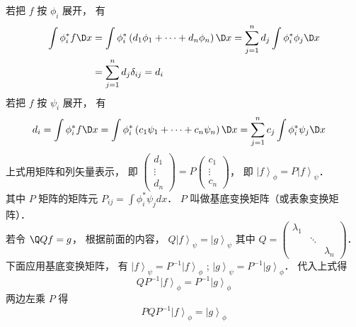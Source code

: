 若把 $f$ 按 ${\phi _i}$ 展开， 有
\begin{equation}
\begin{aligned}
\int {\phi _i^*f   \D x} & = \int {\phi _i^*\left( {{d_1}{\phi _1} + \dots + {d_n}{\phi _n}} \right)   \D x}  = \sum\limits_{j = 1}^n {{d_j}} \int {\phi _i^*{\phi _j} \D x}  \\
&= \sum\limits_{j = 1}^n {{d_j}} {\delta _{ij}} = {d_i}
\end{aligned}
\end{equation}
若把 $f$ 按 $\psi _i$ 展开， 有
\begin{equation}
\begin{aligned}
{d_i} & = \int {\phi _i^*f   \D x}   = \int {\phi _i^*\left( {{c_1}{\psi _1} + \dots + {c_n}{\psi _n}} \right)   \D x} = \sum\limits_{j = 1}^n {{c_j}} \int {\phi _i^*{\psi _j} \D x}
\end{aligned}
\end{equation}
上式用矩阵和列矢量表示， 即 $\left( {\begin{aligned}
{{d_1}}\\
 \vdots \\
{{d_n}}
\end{aligned}} \right) = P\left( {\begin{aligned}
{{c_1}}\\
 \vdots \\
{{c_n}}
\end{aligned}} \right)$，  即 ${\left| f \right\rangle _\phi } = P{\left| f \right\rangle _\psi }$．\\
其中 $P$ 矩阵的矩阵元 ${P_{ij}} = \int {\phi _i^*{\psi _j}dx} $．  $P$ 叫做基底变换矩阵（或表象变换矩阵）．\\
若令 $\Q Q f = g$，  根据前面的内容， $Q{\left| f \right\rangle _\psi } = {\left| g \right\rangle _\psi }$ 其中 $Q = \left( {\begin{aligned}
{{\lambda _1}}&{}&{}\\
{}& \ddots &{}\\
{}&{}&{{\lambda _n}}
\end{aligned}} \right)$． \\
下面应用基底变换矩阵， 有 ${\left| f \right\rangle _\psi } = {P^{ - 1}}{\left| f \right\rangle _\phi }$ ; ${\left| g \right\rangle _\psi } = {P^{ - 1}}{\left| g \right\rangle _\phi }$． 代入上式得
\begin{equation}
  Q{P^{ - 1}}{\left| f \right\rangle _\phi } = {P^{ - 1}}{\left| g \right\rangle _\phi }
\end{equation}
两边左乘 $P$ 得
\begin{equation}
  PQ{P^{ - 1}}{\left| f \right\rangle _\phi } = {\left| g \right\rangle _\phi }
\end{equation}
